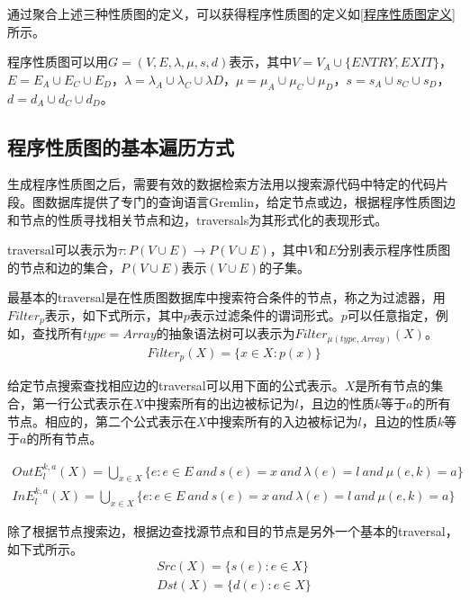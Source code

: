 {通过聚合上述三种性质图的定义，可以获得程序性质图的定义如\ref{程序性质图定义}所示。

\begin{definition}
\label{程序性质图定义}
程序性质图可以用$G=(V,E,\lambda, \mu, s, d)$表示，其中$V=V_{A} \cup \{ENTRY, EXIT\}$，$E = E_{A} \cup E_{C} \cup E_{D}$，$\lambda = \lambda_{A} \cup \lambda_{C} \cup \lambda{D} $，$\mu = \mu_{A} \cup \mu_{C} \cup \mu_{D}$，$s = s_{A} \cup s_{C} \cup s_{D}$，$d = d_{A} \cup d_{C} \cup d_{D}$。
\end{definition}

\subsection{程序性质图的基本遍历方式}
\label{程序性质图的基本遍历方式}
生成程序性质图之后，需要有效的数据检索方法用以搜索源代码中特定的代码片段。图数据库提供了专门的查询语言Gremlin，给定节点或边，根据程序性质图边和节点的性质寻找相关节点和边，traversals为其形式化的表现形式。

\begin{definition}
\label{traversal定义}
traversal可以表示为$\tau : P(V \cup E) \rightarrow P(V \cup E)$，其中$V$和$E$分别表示程序性质图的节点和边的集合，$P(V \cup E)$表示$(V \cup E)$的子集。
\end{definition}

最基本的traversal是在性质图数据库中搜索符合条件的节点，称之为过滤器，用$Filter_{p}$表示，如下式所示，其中$p$表示过滤条件的谓词形式。$p$可以任意指定，例如，查找所有$type=Array$的抽象语法树可以表示为$Filter_{\mu(type,Array)}(X)$。
\begin{align*}
Filter_{p} (X) = \{x \in X : p(x) \}
\end{align*}


给定节点搜索查找相应边的traversal可以用下面的公式表示。$X$是所有节点的集合，第一行公式表示在$X$中搜索所有的出边被标记为$l$，且边的性质$k$等于$a$的所有节点。相应的，第二个公式表示在$X$中搜索所有的入边被标记为$l$，且边的性质$k$等于$a$的所有节点。

\begin{align*}
OutE^{k,a}_{l}(X) = \bigcup_{x \in X} \{e: e \in E \ and\ s(e)=x \ and \ \lambda(e) = l \ and \ \mu(e,k) = a \} \\
InE^{k,a}_{l}(X) = \bigcup_{x \in X} \{e: e \in E \ and\ s(e)=x \ and \ \lambda(e) = l \ and \ \mu(e,k) = a \}
\end{align*}

除了根据节点搜索边，根据边查找源节点和目的节点是另外一个基本的traversal，如下式所示。
\begin{align*}
Src(X) = \{s(e): e \in X \} \\
Dst(X) = \{d(e): e \in X \} 
\end{align*}

}
